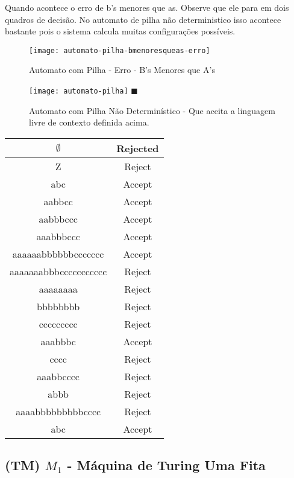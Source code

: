 \documentclass[12pt, a4paper]{article}
\begin{document}
\qquad Quando acontece o erro de b's menores que as. Observe que ele para em dois quadros de decisão. No automato de pilha não deterministico isso acontece bastante pois o sistema calcula muitas configurações possíveis.

\begin{figure}[ht]
  \centering
  \texttt{[image: automato-pilha-bmenoresqueas-erro]}
  \caption{Automato com Pilha - Erro - B's Menores que A's}
\end{figure}


\begin{figure}[ht]
  \centering
  \texttt{[image: automato-pilha]} \flushright $\blacksquare$
  \caption{Automato com Pilha Não Determinístico - Que aceita a linguagem livre de contexto definida acima.}
\end{figure}

\begin{tabular}{|c|c|}
  \hline $\emptyset$           & Rejected \\
  \hline Z	                   & Reject \\
  \hline abc	                 & Accept \\
  \hline aabbcc	               & Accept \\
  \hline aabbbccc	             & Accept \\
  \hline aaabbbccc	           & Accept \\
  \hline aaaaaabbbbbbccccccc	 & Accept \\
  \hline aaaaaaabbbccccccccccc & Reject \\
  \hline aaaaaaaa	             & Reject \\
  \hline bbbbbbbb	             & Reject \\
  \hline ccccccccc	           & Reject \\
  \hline aaabbbc	             & Accept \\
  \hline cccc	                 & Reject \\
  \hline aaabbcccc	           & Reject \\
  \hline abbb	                 & Reject \\
  \hline aaaabbbbbbbbbcccc	   & Reject \\
  \hline abc	                 & Accept \\
  \hline
\end{tabular}

\pagebreak
\subsection{(TM) $M_1$ - Máquina de Turing Uma Fita}
\end{document}
